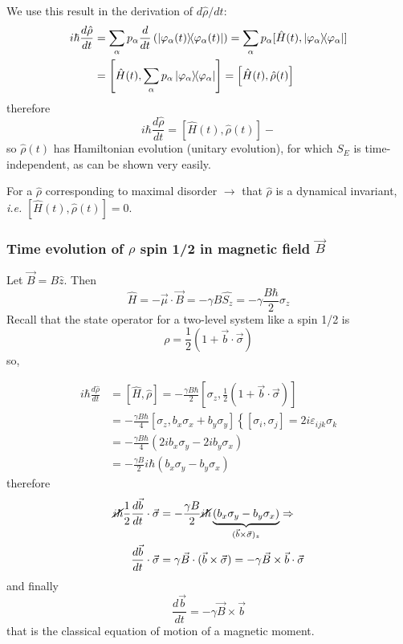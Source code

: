 \documentclass[12pt]{article}
\newcommand{\be}{\begin{equation}}
\newcommand{\ee}{\end{equation}}
\begin{document}
We use this result in the derivation of $d\hat{\rho}/dt$:
\[
\begin{aligned}
i\hbar \frac{d\hat{\rho}}{dt}
&= \sum_\alpha p_\alpha \frac{d}{dt}\left(\op{\varphi_\alpha(t)}\right)
= \sum_\alpha p_\alpha [\hat{H}(t),\op{\varphi_\alpha}]\\
&= \left[\hat{H}(t),\sum_\alpha p_\alpha \op{\varphi_\alpha}\right]
= \left[\hat{H}(t),\hat{\rho}(t)\right]
\end{aligned}
\]
therefore
\be
\boxed{
i\hbar \frac{d\hat{\rho}}{dt} = \left[\hat{H}(t),\hat{\rho}(t)\right]
}-
\ee
so $\hat{\rho}(t)$ has 
Hamiltonian evolution (unitary evolution),
for which \(S_{E}\) is time-independent, as can
be shown very easily.

For a $\hat{\rho}$ corresponding to maximal disorder $\to$ that $\hat{\rho}$
is a dynamical invariant, \textit{i.e.} $[\hat{H}(t),\hat{\rho}(t)] = 0$.

\subsubsection{Time evolution of $\rho$ spin 1/2 in magnetic field $\vec{B}$}

Let $\vec{B} = B\hat{z}$. Then
\be
\hat{H} = -\vec{\mu} \cdot \vec{B}=-\gamma B \hat{S_{z}}=-\gamma \frac{B \hbar}{2} \sigma_{z}
\ee
Recall that the state operator for a two-level system like a spin 1/2 is
\[
\rho = \frac{1}{2}(1+\vec{b}\cdot\vec{\sigma})
\]
so,

\be
\begin{aligned} 
i \hbar \frac{d \hat{\rho}}{d t} 
&=[\hat{H}, \hat{\rho}]=-\frac{\gamma B \hbar}{2}\left[\sigma_{z}, \frac{1}{2}(1+\vec{b} \cdot \vec{\sigma})\right] \\ 
&=-\frac{\gamma B \hbar}{4}\left[\sigma_{z}, b_{x} \sigma_{x}+b_{y} \sigma_{y}\right]\left\{\left[\sigma_{i}, \sigma_{j}\right]=2 i \varepsilon_{i j k} \sigma_{k}\right.\\ 
&=-\frac{\gamma B \hbar}{4}\left(2 i b_{x} \sigma_{y}-2 i b_{y} \sigma_{x}\right)\\
&=-\frac{\gamma B}{2} i \hbar\left(b_{x} \sigma_{y}-b_{y} \sigma_{x}\right)
\end{aligned}
\ee
therefore
\[
\begin{aligned}
\cancel{i \hbar} \frac{1}{2} 
&\frac{d \vec{b}}{d t} \cdot \vec{\sigma}=
-\frac{\gamma B}{2} \cancel{i \hbar} \underbrace{\left(b_{x} \sigma_{y}-b_{y} \sigma_{x}\right)}%
_{(\vec{b} \times \vec{\sigma})_{z}} \Rightarrow\\
&\frac{d \vec{b}}{d t} \cdot \vec{\sigma} = \gamma \vec{B}\cdot(\vec{b} \times \vec{\sigma})
= -\gamma \vec{B}\times\vec{b}\cdot\vec{\sigma}
\end{aligned}
\]
and finally
\be
\boxed{
\frac{d \vec{b}}{d t} = -\gamma \vec{B}\times\vec{b}
} 
\ee
that is the classical equation of motion of a magnetic moment.
\end{document}
